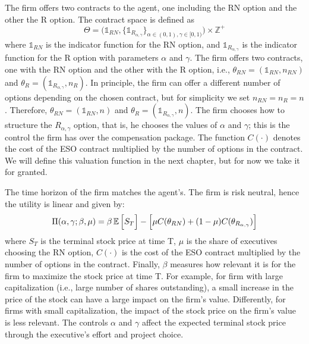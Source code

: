 The firm offers two contracts to the agent, one including the RN option and the other the R option. The contract space is defined as
$$ \Theta = \Biggl( \mathds{1}_{RN}, \bigl\{ \mathds{1}_{R_{\alpha, \gamma}} \bigr\}_{\alpha \in (0,1), \gamma \in [0, 1)} \Biggr) \times \mathbb{Z}^+ $$
where $\mathds{1}_{RN}$ is the indicator function for the RN option, and $\mathds{1}_{R_{\alpha, \gamma}}$ is the indicator function for the R option with parameters $\alpha$ and $\gamma$. The firm offers two contracts, one with the RN option and the other with the R option, i.e., $\theta_{RN} = (\mathds{1}_{RN}, n_{RN})$ and $\theta_{R} = (\mathds{1}_{R_{\alpha, \gamma}}, n_R) $. In principle, the firm can offer a different number of options depending on the chosen contract, but for simplicity we set $n_{RN} = n_R = n$. Therefore, $\theta_{RN} = (\mathds{1}_{RN}, n)$ and $\theta_{R} = (\mathds{1}_{R_{\alpha, \gamma}}, n) $. The firm chooses how to structure the $R_{\alpha, \gamma}$ option, that is, he chooses the values of $\alpha$ and $\gamma$; this is the control the firm has over the compensation package. The function $C(\cdot)$ denotes the cost of the ESO contract multiplied by the number of options in the contract. We will define this valuation function in the next chapter, but for now we take it for granted.

The time horizon of the firm matches the agent's. The firm is risk neutral, hence the utility is linear and given by:
$$ \Pi (\alpha, \gamma; \beta, \mu) = \beta \operatorname{\mathbb{E}} \Big[ S_T \Big] - \Big[ \mu C(\theta_{RN}) + (1-\mu) C(\theta_{R_{\alpha, \gamma}}) \Big] $$
where $S_T$ is the terminal stock price at time T, $\mu$ is the share of executives choosing the RN option, $C(\cdot)$ is the cost of the ESO contract multiplied by the number of options in the contract. Finally, $\beta$ measures how relevant it is for the firm to maximize the stock price at time T. For example, for firm with large capitalization (i.e., large number of shares outstanding), a small increase in the price of the stock can have a large impact on the firm's value. Differently, for firms with small capitalization, the impact of the stock price on the firm's value is less relevant. The controls $\alpha$ and $\gamma$ affect the expected terminal stock price through the executive's effort and project choice.

